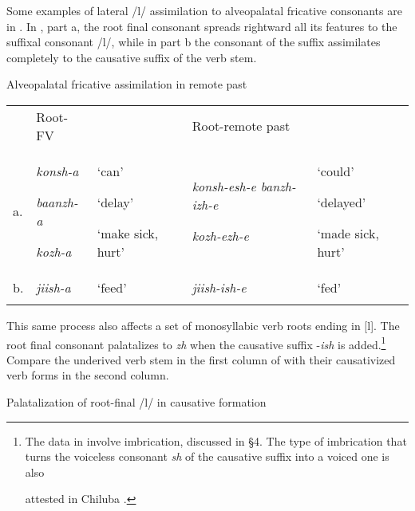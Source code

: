 \documentclass[output=paper]{langsci/langscibook}
\begin{document}
Some examples of lateral /l/ assimilation to alveopalatal fricative consonants are in . In , part a, the root final consonant spreads rightward all its features to the suffixal consonant /l/, while in part b the consonant of the suffix assimilates completely to the causative suffix of the verb stem. 

\begin{table}
\caption{Alveopalatal fricative assimilation in remote past}
\label{tab:5}
\end{table}

\begin{tabularx}{\textwidth}{XXXXX} & Root-FV &  & \multicolumn{2}{l}{Root-remote past}\\
\lsptoprule
a. & {\emph{konsh-a}}

{\emph{baanzh-a}}

\emph{kozh-a  } & {‘can’}

{‘delay’  }

‘make sick, hurt’ & {\emph{konsh-esh-e banzh-izh-e}}

\emph{kozh-ezh-e} & {‘could’}

{‘delayed’}

‘made sick, hurt’\\
b. & \emph{jiish-a} & ‘feed’ & \emph{jiish-ish-e} & ‘fed’\\
\lspbottomrule
\end{tabularx}

This same process also affects a set of monosyllabic verb roots ending in [l]. The root final consonant palatalizes to \emph{zh} when the causative suffix -\emph{ish} is added.\footnote{ The data in  involve imbrication, discussed in §4. The type of imbrication that       turns the voiceless consonant \emph{sh} of the causative suffix into a voiced one is also\par        attested in Chiluba \citep[73]{Lukusa1993}.\par } Compare the underived verb stem in the first column of  with their causativized verb forms in the second column.


\begin{table}
\caption{Palatalization of root-final /l/ in causative formation}
\label{tab:6}
\end{table}
\end{document}
